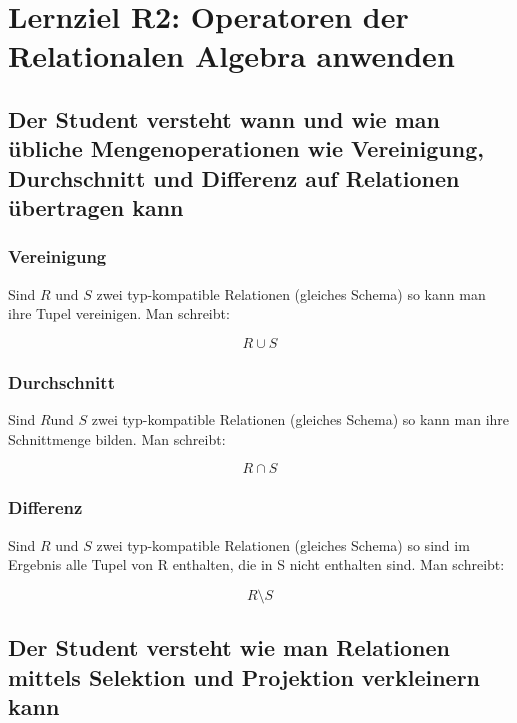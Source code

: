 \section{Lernziel R2: Operatoren der Relationalen Algebra anwenden}

\subsection{Der Student versteht wann und wie man übliche Mengenoperationen wie Vereinigung, Durchschnitt und Differenz auf Relationen übertragen kann}

\subsubsection{Vereinigung}

Sind $R$ und $S$ zwei typ-kompatible Relationen (gleiches Schema) so kann man ihre Tupel vereinigen. Man schreibt:

\begin{equation}
R \cup S
\end{equation}

\subsubsection{Durchschnitt}

Sind $R$und $S$ zwei typ-kompatible Relationen (gleiches Schema) so kann man ihre Schnittmenge bilden. Man schreibt:

\begin{equation}
R \cap S
\end{equation}

\subsubsection{Differenz}

Sind $R$ und $S$ zwei typ-kompatible Relationen (gleiches Schema) so sind im Ergebnis alle Tupel von R enthalten, die in S nicht enthalten sind. Man schreibt:

\begin{equation}
R \setminus S
\end{equation}

\subsection{Der Student versteht wie man Relationen mittels Selektion und Projektion verkleinern kann}

